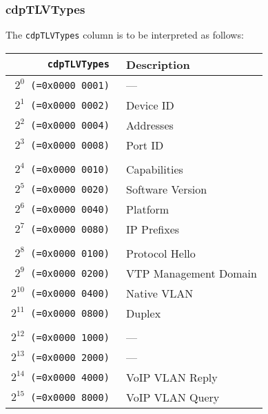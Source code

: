 \documentclass[documentation]{subfiles}
\begin{document}
\subsubsection{cdpTLVTypes}\label{cdpTLVTypes}
The {\tt cdpTLVTypes} column is to be interpreted as follows:

\begin{minipage}{.48\textwidth}
    \begin{longtable}{>{\tt}rl}
        \toprule
        {\bf cdpTLVTypes} & {\bf Description}\\
        \midrule\endhead%
        $2^{0}$  (=0x0000 0001) & ---\\
        $2^{1}$  (=0x0000 0002) & Device ID\\
        $2^{2}$  (=0x0000 0004) & Addresses\\
        $2^{3}$  (=0x0000 0008) & Port ID\\
        \\
        $2^{4}$  (=0x0000 0010) & Capabilities\\
        $2^{5}$  (=0x0000 0020) & Software Version\\
        $2^{6}$  (=0x0000 0040) & Platform\\
        $2^{7}$  (=0x0000 0080) & IP Prefixes\\
        \\
        $2^{8}$  (=0x0000 0100) & Protocol Hello\\
        $2^{9}$  (=0x0000 0200) & VTP Management Domain\\
        $2^{10}$ (=0x0000 0400) & Native VLAN\\
        $2^{11}$ (=0x0000 0800) & Duplex\\
        \\
        $2^{12}$ (=0x0000 1000) & ---\\
        $2^{13}$ (=0x0000 2000) & ---\\
        $2^{14}$ (=0x0000 4000) & VoIP VLAN Reply\\
        $2^{15}$ (=0x0000 8000) & VoIP VLAN Query\\
        \bottomrule
    \end{longtable}
\end{minipage}
\hfill
\end{document}
